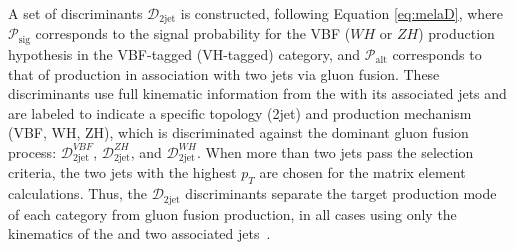 

 
A set of discriminants $\mathcal{D}_\text{2jet}$ is constructed, following Equation \ref{eq:melaD},
where $\mathcal{P}_\text{sig}$ corresponds to the signal probability for the VBF ($WH$ or $ZH$)
production hypothesis in the VBF-tagged (VH-tagged) category, and $\mathcal{P}_\mathrm{alt}$
corresponds to that of \Hboson production in association with two jets via gluon fusion.
These discriminants use full kinematic information from the \Hboson with its associated jets and 
are labeled to indicate a specific topology (2jet) and production mechanism (VBF, WH, ZH), 
which is discriminated against the dominant gluon fusion process:
$\mathcal{D}_\mathrm{2jet}^{VBF}$, 
$\mathcal{D}_\mathrm{2jet}^{ZH}$,
and $\mathcal{D}_\mathrm{2jet}^{WH}$.
When more than two jets pass the selection criteria, the two jets with the highest $p_T$ are chosen 
for the matrix element calculations. Thus, the $\mathcal{D}_\text{2jet}$ discriminants separate the 
target production mode of each category from gluon fusion production,
in all cases using only the kinematics of the \Hboson and two associated jets~\cite{PhysRevD.111.092014}.

    
